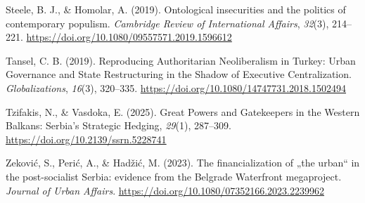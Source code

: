 \documentclass[
  ngerman,
]{agujournal2019}
\newlength{\cslhangindent}
\newenvironment{CSLReferences}[2] %
 {\begin{list}{}{%
  \setlength{\itemindent}{0pt}
  \setlength{\leftmargin}{0pt}
  \setlength{\parsep}{0pt}
  \ifodd #1
   \setlength{\leftmargin}{\cslhangindent}
   \setlength{\itemindent}{-1\cslhangindent}
  \fi
  \setlength{\itemsep}{#2\baselineskip}}}
 {\end{list}}
\begin{document}
\begin{CSLReferences}{1}{0}
Steele, B. J., \& Homolar, A. (2019). Ontological insecurities and the
politics of contemporary populism. \emph{Cambridge Review of
International Affairs}, \emph{32}(3), 214--221.
\url{https://doi.org/10.1080/09557571.2019.1596612}

Tansel, C. B. (2019). Reproducing Authoritarian Neoliberalism in
{T}urkey: Urban Governance and State Restructuring in the Shadow of
Executive Centralization. \emph{Globalizations}, \emph{16}(3), 320--335.
\url{https://doi.org/10.1080/14747731.2018.1502494}

Tzifakis, N., \& Vasdoka, E. (2025). Great Powers and Gatekeepers in the
Western Balkans: Serbia's Strategic Hedging, \emph{29}(1), 287--309.
\url{https://doi.org/10.2139/ssrn.5228741}

Zeković, S., Perić, A., \& Hadžić, M. (2023). The financialization of
{„the urban``} in the post-socialist {Serbia}: evidence from the
{Belgrade} {Waterfront} megaproject. \emph{Journal of Urban Affairs}.
\url{https://doi.org/10.1080/07352166.2023.2239962}

\end{CSLReferences}
\end{document}
